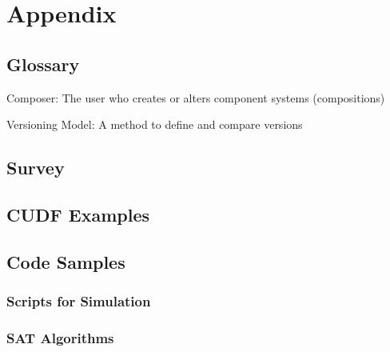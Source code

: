 \chapter{Appendix}

\section{Glossary}
Composer: The user who creates or alters component systems (compositions)

Versioning Model: A method to define and compare versions

\section{Survey}
\label{survey}

\section{CUDF Examples}

\section{Code Samples}
\subsection{Scripts for Simulation}
\subsection{SAT Algorithms}